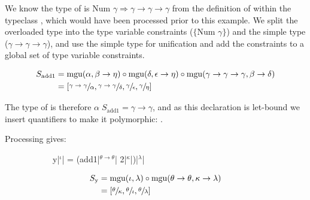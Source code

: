 \documentclass[dissertation.tex]{subfiles}
\begin{document}
{{{            We know the type of \haskell{+} is \(\text{Num }\gamma \Rightarrow
            \gamma\rightarrow\gamma\rightarrow\gamma\) from the definition of \haskell{+} within the typeclass
            , which would have been processed prior to this example. We split the overloaded type into the
            type variable constraints (\(\{\text{Num }\gamma\}\)) and the simple type
            (\(\gamma\rightarrow\gamma\rightarrow\gamma\)), and use the simple type for unification and add the
            constraints to a global set of type variable constraints.

            \begin{figure}
                \centering
                \begin{equation*}
                \begin{split}
                    S_\text{add1} & = \text{mgu}(\alpha, \beta \rightarrow \eta) \circ \text{mgu}(\delta, \epsilon \rightarrow \eta) \circ \text{mgu}(\gamma\rightarrow\gamma\rightarrow\gamma, \beta \rightarrow \delta) \\
                                  & = [\sfrac{\gamma\rightarrow\gamma}{\alpha}, \sfrac{\gamma\rightarrow\gamma}{\delta}, \sfrac{\gamma}{\epsilon}, \sfrac{\gamma}{\eta}]
                \end{split}
                \end{equation*}
            \end{figure}

            The type of  is therefore \(\alpha \; S_\text{add1} = \gamma\rightarrow\gamma\), and as this
            declaration is let-bound we insert quantifiers to make it polymorphic: .

            Processing  gives:

            \begin{figure}[H]
            \begin{subfigure}[c]{\textwidth}
                \centering
                \begin{haskellfigure}
                y|\(^\iota\)| = (add1|\(^{\theta\rightarrow\theta}\)| 2|\(^\kappa\)|)|\(^\lambda\)|
                \end{haskellfigure}
            \end{subfigure}

            \begin{subfigure}[c]{\textwidth}
                \centering
                \begin{equation*}
                \begin{split}
                    S_\text{y} & = \text{mgu}(\iota, \lambda) \circ \text{mgu}(\theta\rightarrow\theta, \kappa\rightarrow\lambda) \\
                               & = [\sfrac{\theta}{\kappa}, \sfrac{\theta}{\iota}, \sfrac{\theta}{\lambda}]
                \end{split}
                \end{equation*}
            \end{subfigure}
            \end{figure}

}}}
\end{document}

